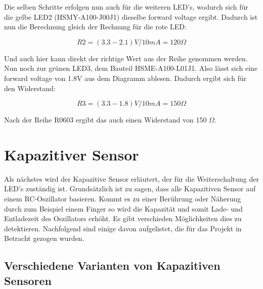 \documentclass[a4paper,
DIV=13,
12pt,
BCOR=10mm,
department=FakEI,
parskip=half,
automark,
]{article}
\begin{document}
Die selben Schritte erfolgen nun auch für die weiteren LED's, wodurch sich für die gelbe LED2 (HSMY-A100-J00J1) dieselbe forward voltage ergibt. Dadurch ist nun die Berechnung gleich der Rechnung für die rote LED:

$$ R2 = (3.3 - 2.1)V / 10mA = 120 \Omega$$

Und auch hier kann direkt der richtige Wert aus der Reihe genommen werden.\\ 

Nun noch zur grünen LED3, dem Bauteil HSME-A100-L01J1. Also lässt sich eine forward voltage von 1.8V aus dem Diagramm ablesen. 
Dadurch ergibt sich für den Widerstand:

$$ R3 = (3.3 - 1.8)V / 10mA = 150 \Omega$$

Nach der Reihe R0603 ergibt das auch einen Widerstand von 150 $\Omega$.

\newpage
\section{Kapazitiver Sensor}
Als nächstes wird der Kapazitive Sensor erläutert, der für die Weiterschaltung der LED's zuständig ist. Grundsätzlich ist zu sagen, dass alle Kapazitiven Sensor auf einem RC-Oszillator basieren. Kommt es zu einer Berührung oder Näherung durch zum Beispiel einem Finger so wird die Kapazität und somit Lade- und Entladezeit des Oszillators erhöht. Es gibt verschieden Möglichkeiten dies zu detektieren. Nachfolgend sind einige davon aufgelistet, die für das Projekt in Betracht gezogen wurden.
\subsection{Verschiedene Varianten von Kapazitiven Sensoren}
\label{VerschiedeneKapSenVar}
\end{document}
